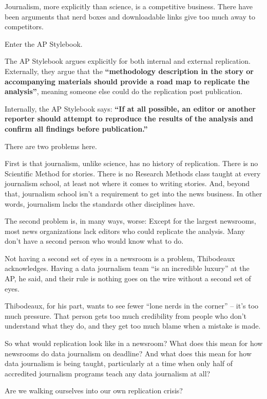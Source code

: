 \documentclass[]{book}
\begin{document}
Journalism, more explicitly than science, is a competitive business. There have been arguments that nerd boxes and downloadable links give too much away to competitors.

Enter the AP Stylebook.

The AP Stylebook argues explicitly for both internal and external replication. Externally, they argue that the \textbf{``methodology description in the story or accompanying materials should provide a road map to replicate the analysis''}, meaning someone else could do the replication post publication.

Internally, the AP Stylebook says: \textbf{``If at all possible, an editor or another reporter should attempt to reproduce the results of the analysis and confirm all findings before publication.''}

There are two problems here.

First is that journalism, unlike science, has no history of replication. There is no Scientific Method for stories. There is no Research Methods class taught at every journalism school, at least not where it comes to writing stories. And, beyond that, journalism school isn't a requirement to get into the news business. In other words, journalism lacks the standards other disciplines have.

The second problem is, in many ways, worse: Except for the largest newsrooms, most news organizations lack editors who could replicate the analysis. Many don't have a second person who would know what to do.

Not having a second set of eyes in a newsroom is a problem, Thibodeaux acknowledges. Having a data journalism team ``is an incredible luxury'' at the AP, he said, and their rule is nothing goes on the wire without a second set of eyes.

Thibodeaux, for his part, wants to see fewer ``lone nerds in the corner'' -- it's too much pressure. That person gets too much credibility from people who don't understand what they do, and they get too much blame when a mistake is made.

So what would replication look like in a newsroom? What does this mean for how newsrooms do data journalism on deadline? And what does this mean for how data journalism is being taught, particularly at a time when only half of accredited journalism programs teach any data journalism at all?

Are we walking ourselves into our own replication crisis?
\end{document}
